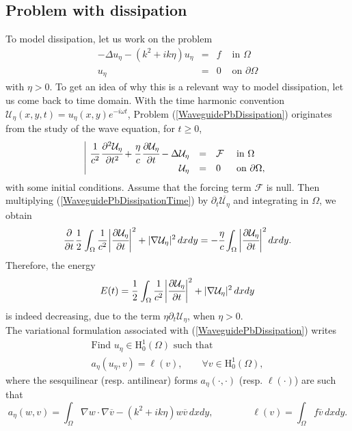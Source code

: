 \documentclass[11pt,a4paper]{report}
\newcommand{\om}{\omega}
\newcommand{\Om}{\Omega}
\newcommand{\mrm}[1]{\mathrm{#1}}
\newcommand{\mH}{\mrm{H}}
\begin{document}
\subsection{Problem with dissipation}\label{ParaPbDissip}

To model dissipation, let us work on the problem 
\begin{equation}\label{WaveguidePbDissipation}
\begin{array}{|rcll}
-\Delta u_\eta-(k^2+ik\eta)u_\eta&=&f&\mbox{ in }\Om \\[2pt]
u_\eta&=&0&\mbox{ on }\partial\Om
\end{array}
\end{equation}
with $\eta>0$. To get an idea of why this is a relevant way to model dissipation, let us come back to time domain. With the time harmonic convention $\mathcal{U}_\eta(x,y,t)=u_\eta(x,y)e^{-i\om t}$, Problem (\ref{WaveguidePbDissipation}) originates from the study of the wave equation, for $t\ge0$,
\begin{equation}\label{WaveguidePbDissipationTime}
\begin{array}{|rcll}
\cfrac{1}{c^2}\,\cfrac{\partial^2 \mathcal{U}_\eta}{\partial t^2}+\cfrac{\eta}{c}\,\cfrac{\partial \mathcal{U}_\eta}{\partial t}-\Delta \mathcal{U}_\eta&=&\mathcal{F}&\mbox{ in }\Om \\[2pt]
\mathcal{U}_\eta&=&0&\mbox{ on }\partial\Om,
\end{array}
\end{equation}
with some initial conditions. Assume that the forcing term $\mathcal{F}$ is null. Then multiplying (\ref{WaveguidePbDissipationTime}) by $\partial_t\overline{\mathcal{U}_\eta}$ and integrating in $\Om$, we obtain
\[
\cfrac{\partial }{\partial t}\,\cfrac{1}{2}\,\int_{\Om}\cfrac{1}{c^2}\,\bigg|\cfrac{\partial \mathcal{U}_\eta}{\partial t}\bigg|^2+|\nabla \mathcal{U}_\eta|^2\,dxdy =-\cfrac{\eta}{c} \int_{\Om}\bigg|\cfrac{\partial \mathcal{U}_\eta}{\partial t}\bigg|^2\,dxdy.
\]
Therefore, the energy
\[
E(t)=\cfrac{1}{2}\,\int_{\Om}\cfrac{1}{c^2}\,\bigg|\cfrac{\partial \mathcal{U}_\eta}{\partial t}\bigg|^2+|\nabla \mathcal{U}_\eta|^2\,dxdy
\]
is indeed decreasing, due to the term $\eta\partial_t\mathcal{U}_\eta$, when $\eta>0$.\\
\newline
The variational formulation associated with (\ref{WaveguidePbDissipation}) writes 
\begin{equation}\label{WaveguidePbDissipationVaria}
\begin{array}{|l}
\mbox{Find }u_\eta\in\mrm{H}^1_0(\Om) \mbox{ such that }\\[3pt]
a_\eta(u_\eta,v)=\ell(v),\qquad \forall v\in\mH^1_0(\Om),
\end{array}
\end{equation}
where the sesquilinear (resp. antilinear) forms $a_\eta(\cdot,\cdot)$ (resp. $\ell(\cdot)$) are such that  
\[
a_\eta(w,v)=\int_{\Om}\nabla w\cdot\nabla \overline{v}-(k^2+ik\eta )w \overline{v}\,dxdy,\qquad\qquad \ell(v)=\int_{\Om}f\overline{v}\,dxdy.
\]
\end{document}
